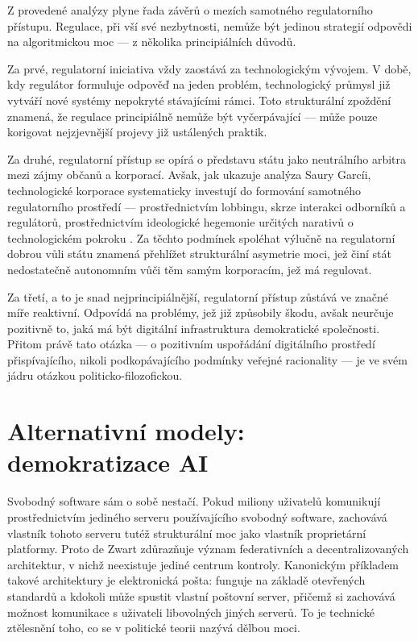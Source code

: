 Z provedené analýzy plyne řada závěrů o mezích samotného regulatorního přístupu. Regulace, při vší své nezbytnosti, nemůže být jedinou strategií odpovědi na algoritmickou moc — z několika principiálních důvodů.

Za prvé, regulatorní iniciativa vždy zaostává za technologickým vývojem. V době, kdy regulátor formuluje odpověď na jeden problém, technologický průmysl již vytváří nové systémy nepokryté stávajícími rámci. Toto strukturální zpoždění znamená, že regulace principiálně nemůže být vyčerpávající — může pouze korigovat nejzjevnější projevy již ustálených praktik.

Za druhé, regulatorní přístup se opírá o představu státu jako neutrálního arbitra mezi zájmy občanů a korporací. Avšak, jak ukazuje analýza Saury Garcíi, technologické korporace systematicky investují do formování samotného regulatorního prostředí — prostřednictvím lobbingu, skrze interakci odborníků a regulátorů, prostřednictvím ideologické hegemonie určitých narativů o technologickém pokroku \parencite{SauraGarcia24}. Za těchto podmínek spoléhat výlučně na regulatorní dobrou vůli státu znamená přehlížet strukturální asymetrie moci, jež činí stát nedostatečně autonomním vůči těm samým korporacím, jež má regulovat.

Za třetí, a to je snad nejprincipiálnější, regulatorní přístup zůstává ve značné míře reaktivní. Odpovídá na problémy, jež již způsobily škodu, avšak neurčuje pozitivně to, jaká má být digitální infrastruktura demokratické společnosti. Přitom právě tato otázka — o pozitivním uspořádání digitálního prostředí přispívajícího, nikoli podkopávajícího podmínky veřejné racionality — je ve svém jádru otázkou politicko-filozofickou.

\section{Alternativní modely: demokratizace AI}
Svobodný software sám o sobě nestačí. Pokud miliony uživatelů komunikují prostřednictvím jediného serveru používajícího svobodný software, zachovává vlastník tohoto serveru tutéž strukturální moc jako vlastník proprietární platformy. Proto de Zwart zdůrazňuje význam federativních a decentralizovaných architektur, v nichž neexistuje jediné centrum kontroly. Kanonickým příkladem takové architektury je elektronická pošta: funguje na základě otevřených standardů a kdokoli může spustit vlastní poštovní server, přičemž si zachovává možnost komunikace s uživateli libovolných jiných serverů. To je technické ztělesnění toho, co se v politické teorii nazývá dělbou moci.

